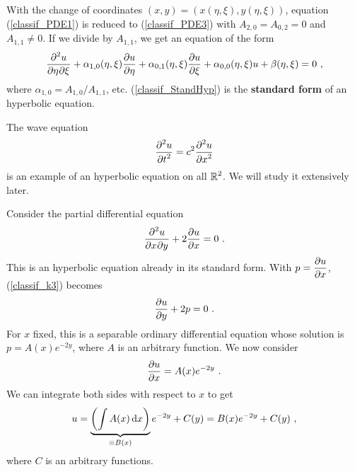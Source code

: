 With the change of coordinates $(x,y)=(x(\eta,\xi),y(\eta,\xi))$,
equation (\ref{classif_PDE1}) is reduced to
(\ref{classif_PDE3}) with $A_{2,0} = A_{0,2} = 0$ and $A_{1,1} \neq 0$.
If we divide by $A_{1,1}$, we get an equation of the form
\begin{equation} \label{classif_StandHyp}
\pdydxnm{u}{\eta}{\xi}{2}{}{}
+ \alpha_{1,0}(\eta,\xi) \pdydx{u}{\eta}
+ \alpha_{0,1}(\eta,\xi) \pdydx{u}{\xi} + \alpha_{0,0}(\eta,\xi)u +
\beta (\eta,\xi) = 0 \  , 
\end{equation}
where $\displaystyle \alpha_{1,0} = A_{1,0}/A_{1,1}$, etc.
(\ref{classif_StandHyp}) is the
{\bfseries standard form} of an hyperbolic equation.

\begin{egg}
The wave equation
\[
\pdydxn{u}{t}{2} = c^2 \pdydxn{u}{x}{2}
\]
is an example of an hyperbolic equation on all $\displaystyle \RR^2$.
We will study it extensively later.
\end{egg}

\begin{egg}
Consider the partial differential equation
\begin{equation}\label{classif_k3}
\pdydxnm{u}{x}{y}{2}{}{} + 2 \pdydx{u}{x} = 0 \ .
\end{equation}
This is an hyperbolic equation already in its standard form.  With
$\displaystyle p = \pdydx{u}{x}$, (\ref{classif_k3}) becomes
\[
\pdydx{u}{y} + 2 p = 0 \ .
\]
For $x$ fixed, this is a separable ordinary differential equation
whose solution is $\displaystyle p = A(x) e^{-2y}$, where $A$ is an
arbitrary function.  We now consider
\[
\pdydx{u}{x} = A(x) e^{-2y} \ .
\]
We can integrate both sides with respect to $x$ to get
\[
u = \underbrace{\left(\int A(x) \dx{x}\right)}_{\equiv B(x)} e^{-2y} + C(y)
= B(x) e^{-2y} +C(y) \ ,
\]
where $C$ is an arbitrary functions.
\end{egg}

